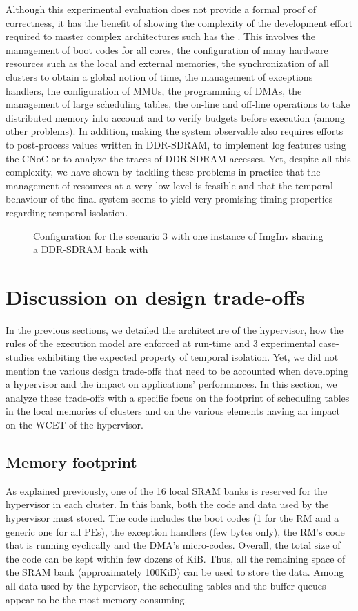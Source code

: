 \documentclass[main.tex]{subfiles}
\begin{document}
Although this experimental evaluation does not provide a formal proof of correctness, it has the benefit of showing the complexity of the development effort required to master complex architectures such has the \mppalong. This involves the management of boot codes for all cores, the configuration of many hardware resources such as the local and external memories, the synchronization of all clusters to obtain a global notion of time, the management of exceptions handlers, the configuration of MMUs, the programming of DMAs, the management of large scheduling tables, the on-line and off-line operations to take distributed memory into account and to verify budgets before execution (among other problems). In addition, making the system observable also requires efforts to post-process values written in DDR-SDRAM, to implement log features using the CNoC or to analyze the traces of DDR-SDRAM accesses. Yet, despite all this complexity, we have shown by tackling these problems in practice that the management of resources at a very low level is feasible and that the temporal behaviour of the final system seems to yield very promising timing properties regarding temporal isolation.

\begin{figure}
    \centering
    \scalebox{0.7}{}
    \caption{Configuration for the scenario 3 with one instance of ImgInv sharing a DDR-SDRAM bank with \rosace}
    \label{fig_implemExecModel_scenario3budget}
\end{figure}

\section{Discussion on design trade-offs}
In the previous sections, we detailed the architecture of the hypervisor, how the rules of the execution model are enforced at run-time and 3 experimental case-studies exhibiting the expected property of temporal isolation. Yet, we did not mention the various design trade-offs that need to be accounted when developing a hypervisor and the impact on applications' performances. In this section, we analyze these trade-offs with a specific focus on the footprint of scheduling tables in the local memories of clusters and on the various elements having an impact on the WCET of the hypervisor.

\subsection{Memory footprint}
As explained previously, one of the 16 local SRAM banks is reserved for the hypervisor in each cluster. In this bank, both the code and data used by the hypervisor must stored. The code includes the boot codes (1 for the RM and a generic one for all PEs), the exception handlers (few bytes only), the RM's code that is running cyclically and the DMA's micro-codes. Overall, the total size of the code can be kept within few dozens of KiB. Thus, all the remaining space of the SRAM bank (approximately 100KiB) can be used to store the data. Among all data used by the hypervisor, the scheduling tables and the buffer queues appear to be the most memory-consuming.
\end{document}
